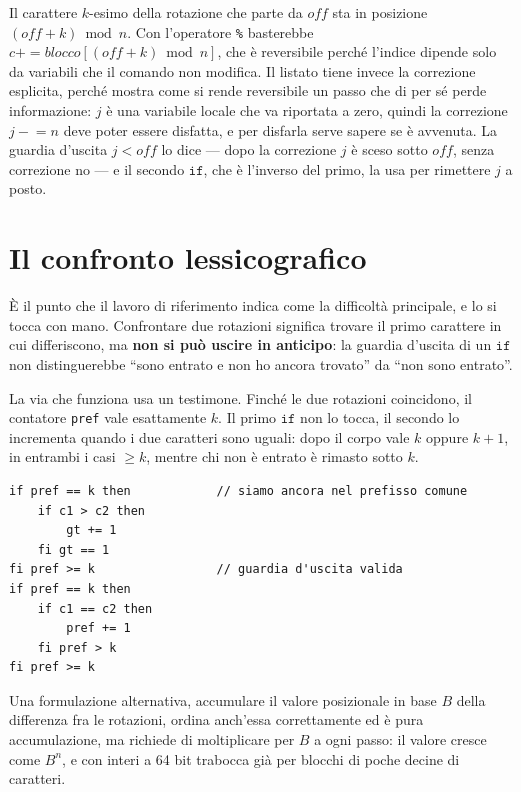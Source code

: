\noindent
Il carattere $k$-esimo della rotazione che parte da $\mathit{off}$ sta in
posizione $(\mathit{off}+k) \bmod n$. Con l'operatore \texttt{\%} basterebbe
$c \mathbin{+\!\!=} \mathit{blocco}[(\mathit{off}+k) \bmod n]$, che è
reversibile perché l'indice dipende solo da variabili che il comando non
modifica. Il listato tiene invece la correzione esplicita, perché mostra come si
rende reversibile un passo che di per sé perde informazione: $j$ è una
variabile locale che va riportata a zero, quindi la correzione
$j \mathrel{-}= n$ deve poter essere disfatta, e per disfarla serve sapere se è
avvenuta. La guardia d'uscita $j < \mathit{off}$ lo dice — dopo la correzione
$j$ è sceso sotto $\mathit{off}$, senza correzione no — e il secondo
$\mathtt{if}$, che è l'inverso del primo, la usa per rimettere $j$ a posto.

\section{Il confronto lessicografico}

È il punto che il lavoro di riferimento indica come la difficoltà principale, e
lo si tocca con mano. Confrontare due rotazioni significa trovare il primo
carattere in cui differiscono, ma \textbf{non si può uscire in anticipo}: la
guardia d'uscita di un $\mathtt{if}$ non distinguerebbe ``sono entrato e non ho
ancora trovato'' da ``non sono entrato''.

La via che funziona usa un testimone. Finché le due rotazioni coincidono, il
contatore \texttt{pref} vale esattamente $k$. Il primo $\mathtt{if}$ non lo
tocca, il secondo lo incrementa quando i due caratteri sono uguali: dopo il
corpo vale $k$ oppure $k+1$, in entrambi i casi $\geq k$, mentre chi non è
entrato è rimasto sotto $k$.

\begin{lstlisting}
if pref == k then            // siamo ancora nel prefisso comune
    if c1 > c2 then
        gt += 1
    fi gt == 1
fi pref >= k                 // guardia d'uscita valida
if pref == k then
    if c1 == c2 then
        pref += 1
    fi pref > k
fi pref >= k
\end{lstlisting}

\noindent
Una formulazione alternativa, accumulare il valore posizionale in base $B$ della
differenza fra le rotazioni, ordina anch'essa correttamente ed è pura
accumulazione, ma richiede di moltiplicare per $B$ a ogni passo: il valore
cresce come $B^n$, e con interi a 64 bit trabocca già per blocchi di poche
decine di caratteri.

